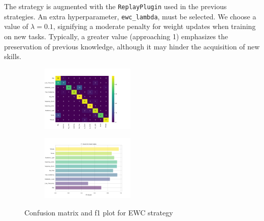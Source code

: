 The strategy is augmented with the \verb|ReplayPlugin| used in the previous strategies. An extra hyperparameter, \verb|ewc_lambda|, must be selected. We choose a value of $\lambda = 0.1$, signifying a moderate penalty for weight updates when training on new tasks. Typically, a greater value (approaching 1) emphasizes the preservation of previous knowledge, although it may hinder the acquisition of new skills.

\begin{figure}[H]
\centering
\begin{subfigure}
  \centering
  \includegraphics[width=0.49\textwidth]{Images/cm_EWC_MultiView_100epochs.png}  
  \label{fig:sub-first4}
\end{subfigure}
\begin{subfigure}
  \centering
  \includegraphics[width=0.49\textwidth]{Images/f1_EWC_MultiView_100epochs.png}  
  \label{fig:sub-second4}
\end{subfigure}
\caption{Confusion matrix and f1 plot for EWC strategy}
\label{fig:cm_f1_ewc_baseline}
\end{figure}

